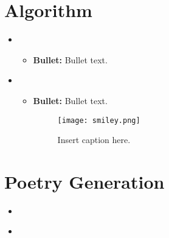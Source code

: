 \section{Algorithm}
\medskip
\begin{itemize}

    What packages did you use for the algorithm?
    What decisions did you have to make when running the algorithm and what did you try? e.g number of states
    How did this affect the sonnets that were generated

    \item {}
    \begin{itemize}
    \item \textbf{Bullet:} Bullet text.
    \end{itemize}

    \item {}
    \begin{itemize}
    \item \textbf{Bullet:} Bullet text.

    \begin{figure}[H]
    \centering
    \texttt{[image: smiley.png]}
    \caption{Insert caption here.}
    \end{figure}

    \end{itemize}

\end{itemize}



\section{Poetry Generation}
\medskip
\begin{itemize}

    How did you generate your poem?
How did you get your poem to look as much like a sonnet as possible?
What makes sense/what doesn't about the sonnets generated?

    \item {} \\

    \item {} \\

\end{itemize}



